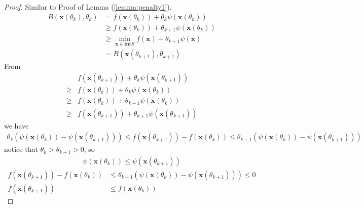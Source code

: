 \begin{proof}
    Similar to Proof of Lemma (\ref{lemma:penalty1}),
    \begin{align}
        B(\mathbf{x}(\theta_k), \theta_k) &= 
        f(\mathbf{x}(\theta_k))
        + \theta_k \psi(\mathbf{x}(\theta_k)) \\
        &\geq f(\mathbf{x}(\theta_k))
        + \theta_{k+1} \psi(\mathbf{x}(\theta_k)) \\
        &\geq \min_{\mathbf{x}\in \mathbf{int}S}
        f(\mathbf{x})
        + \theta_{k+1} \psi(\mathbf{x}) \\
        &= B(\mathbf{x}(\theta_{k+1}), \theta_{k+1})
    \end{align}
    From
    \begin{align}
        &f(\mathbf{x}(\theta_{k+1}))
        + \theta_k \psi(\mathbf{x}(\theta_{k+1})) \\
        \geq &f(\mathbf{x}(\theta_k))
        + \theta_k \psi(\mathbf{x}(\theta_k)) \\
        \geq &f(\mathbf{x}(\theta_k))
        + \theta_{k+1} \psi(\mathbf{x}(\theta_k)) \\
        \geq &f(\mathbf{x}(\theta_{k+1}))
        + \theta_{k+1} \psi(\mathbf{x}(\theta_{k+1}))
    \end{align}
    we have
    \begin{align}
        \theta_{k}(\psi(\mathbf{x}(\theta_{k})) - 
        \psi(\mathbf{x}(\theta_{k+1}))) \leq
        f(\mathbf{x}(\theta_{k+1})) - 
        f(\mathbf{x}(\theta_{k})) \leq
        \theta_{k+1}(\psi(\mathbf{x}(\theta_{k})) - 
        \psi(\mathbf{x}(\theta_{k+1})))
    \end{align}
    notice that $\theta_k > \theta_{k+1} > 0$, so
    \begin{align}
        \psi(\mathbf{x}(\theta_k)) \leq
        \psi(\mathbf{x}(\theta_{k+1}))
    \end{align}
    \begin{align}
        f(\mathbf{x}(\theta_{k+1})) - 
        f(\mathbf{x}(\theta_{k})) &\leq
        \theta_{k+1}(\psi(\mathbf{x}(\theta_{k})) - 
        \psi(\mathbf{x}(\theta_{k+1}))) \leq 0 \\
        f(\mathbf{x}(\theta_{k+1})) &\leq 
        f(\mathbf{x}(\theta_{k})) 
    \end{align}
\end{proof}
